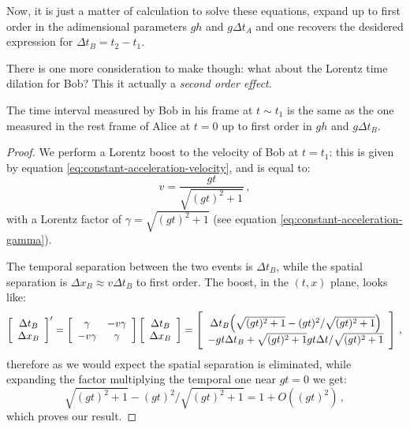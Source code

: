 \documentclass[main.tex]{subfiles}
\begin{document}
Now, it is just a matter of calculation to solve these equations, expand up to first order in the adimensional parameters \(gh\) and \(g \Delta t_A\) and one recovers the desidered expression for  \(\Delta t_B = t_2 - t_1\).

There is one more consideration to make though: what about the Lorentz time dilation for Bob? This it actually a \emph{second order effect}.

\begin{claim}
The time interval measured by Bob in his frame at \(t \sim t_1\) is the same as the one measured in the rest frame of Alice at \(t=0\) up to first order in \(gh\) and \(g \Delta t_B\).
\end{claim}

\begin{proof}
We perform a Lorentz boost to the velocity of Bob at \(t=t_1 \): this is given by equation \eqref{eq:constant-acceleration-velocity}, and is equal to:
%
\begin{equation}
  v = \frac{gt }{\sqrt{(gt)^2 + 1}}
\,,
\end{equation}
%
with a Lorentz factor of \(\gamma = \sqrt{(gt)^2 +1} \) (see equation \eqref{eq:constant-acceleration-gamma}).

The temporal separation between the two events is \(\Delta t_B\), while the spatial separation is \(\Delta x_B \approx  v \Delta t_B\) to first order. The boost, in the \((t, x)\) plane, looks like: 
%
\begin{equation}
  \left[\begin{array}{c}
  \Delta t_B \\ 
  \Delta x_B
  \end{array}\right]'
  =
  \left[\begin{array}{cc}
  \gamma  & -v \gamma  \\ 
  -v \gamma  & \gamma 
  \end{array}\right]  
  \left[\begin{array}{c}
  \Delta t_B \\ 
  \Delta x_B
  \end{array}\right] 
  =
  \left[\begin{array}{c}
  \Delta t_B \qty(\sqrt{(gt)^2+1} - (gt)^2/\sqrt{(gt)^2+1}) \\ 
  -gt \Delta t_B + \sqrt{(gt)^2+1} gt \Delta t / \sqrt{(gt)^2+1}
  \end{array}\right]
\,,
\end{equation}
%
therefore as we would expect the spatial separation is eliminated, while expanding the factor multiplying the temporal one near \(gt = 0\) we get: 
%
\begin{equation}
  \sqrt{(gt)^2+1} - (gt)^2/\sqrt{(gt)^2+1} = 1+O((gt)^2)
\,,
\end{equation}
%
which proves our result.
\end{proof}
\end{document}

